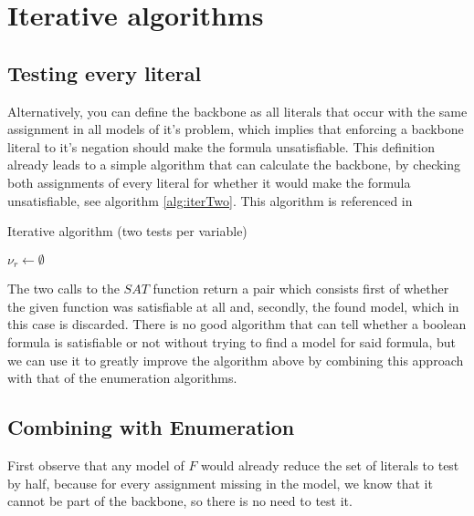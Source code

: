\section{Iterative algorithms}
\subsection{Testing every literal}
Alternatively, you can define the backbone as all literals that occur with the same assignment in all models of it's problem, which implies that enforcing a backbone literal to it's negation should make the formula unsatisfiable. This definition already leads to a simple algorithm that can calculate the backbone, by checking both assignments of every literal for whether it would make the formula unsatisfiable, see algorithm \ref{alg:iterTwo}. This algorithm is referenced in \cite{mjl10}
\begin{algorithm}
\caption{{\sc Iterative algorithm (two tests per variable)}}
\DontPrintSemicolon
{}
$\nu_r \gets \emptyset$\;
\;
\label{alg:iterTwo}
\end{algorithm}

The two calls to the $SAT$ function return a pair which consists first of whether the given function was satisfiable at all and, secondly, the found model, which in this case is discarded. There is no good algorithm that can tell whether a boolean formula is satisfiable or not without trying to find a model for said formula, but we can use it to greatly improve the algorithm above by combining this approach with that of the enumeration algorithms.

\subsection{Combining with Enumeration}
First observe that any model of $F$ would already reduce the set of literals to test by half, because for every assignment missing in the model, we know that it cannot be part of the backbone, so there is no need to test it. 

